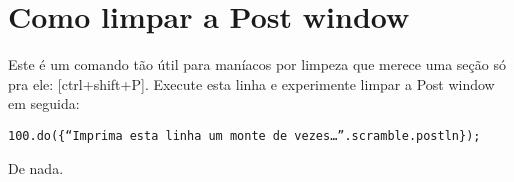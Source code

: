 \section{Como limpar a Post window}

Este é um comando tão útil para maníacos por limpeza que merece uma seção só pra ele: [ctrl+shift+P]. Execute esta linha e experimente limpar a Post window em seguida:

 
\begin{lstlisting}[style=SuperCollider-IDE, basicstyle=\scttfamily\footnotesize]
100.do({“Imprima esta linha um monte de vezes…”.scramble.postln});
\end{lstlisting}
 
De nada.

